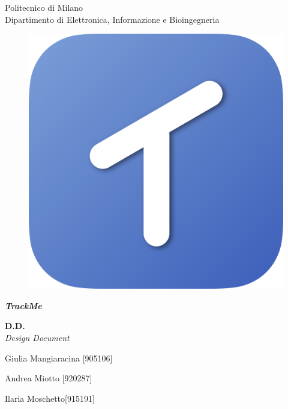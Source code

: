 \thispagestyle{empty}

\begin{center}

	\Huge Politecnico di Milano  \\   	\vspace{14pt}
    \Large Dipartimento di Elettronica, Informazione e Bioingegneria
    
    \vspace{30pt}
    
      \begin{figure}[h]
      	\centering
        \includegraphics[scale=0.25]{Pictures/Icon.png}
      \end{figure}
    
    \vspace{25pt}
    
    \Huge \textbf{\emph{TrackMe}} 
    \\
    \vspace{12pt}
    
    \huge \textbf{D.D.} \\
    \vspace{7pt}
    \Large \emph{Design Document} \\
    
    \vspace{110pt}
    
    \large Giulia Mangiaracina [905106]\\
    
    \vspace{5pt}
    
    \large Andrea Miotto [920287]\\
    
    \vspace{5pt}
    
    \large Ilaria Moschetto[915191]
    
\end{center}